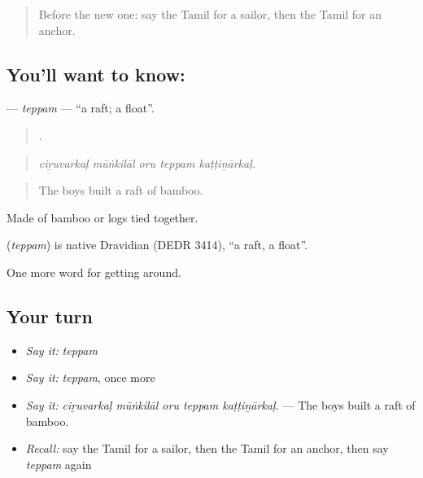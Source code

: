 \label{lesson:TA-C417-teppam}



\begin{quote}
Before the new one: say the Tamil for a sailor, then the Tamil for an anchor.
\end{quote}

\subsection*{You'll want to know: }
\textbf{} — \emph{teppam} — \textquotedblleft{}a raft; a float\textquotedblright{}.

\begin{quote}
    .
\end{quote}

\begin{quote}
\emph{ciṟuvarkaḷ mūṅkilāl oru teppam kaṭṭiṉārkaḷ.}
\end{quote}

\begin{quote}
The boys built a raft of bamboo.
\end{quote}

Made of bamboo or logs tied together.

\begin{cousinweb}
\textbf{} (\emph{teppam}) is native Dravidian (DEDR 3414), \textquotedblleft{}a raft, a float\textquotedblright{}.
\end{cousinweb}

\begin{grammarlens}[title={What you've built}]
One more word for getting around.
\end{grammarlens}

\subsection*{Your turn}
\begin{itemize}
\raggedright
  \item \emph{Say it:} \emph{teppam}
  \item \emph{Say it:} \emph{teppam}, once more
  \item \emph{Say it:} \emph{ciṟuvarkaḷ mūṅkilāl oru teppam kaṭṭiṉārkaḷ.} — The boys built a raft of bamboo.
  \item \emph{Recall:} say the Tamil for a sailor, then the Tamil for an anchor, then say \emph{teppam} again
\end{itemize}

